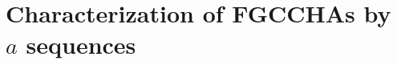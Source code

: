 \documentclass[11pt]{amsart}
\theoremstyle{definition}
\numberwithin{equation}{section}
\newcommand{\FGCCHAs}{\textsf{FGCCHA}s\xspace}
\begin{document}

%

\section{Characterization of \FGCCHAs by $a$ sequences}
\end{document}
